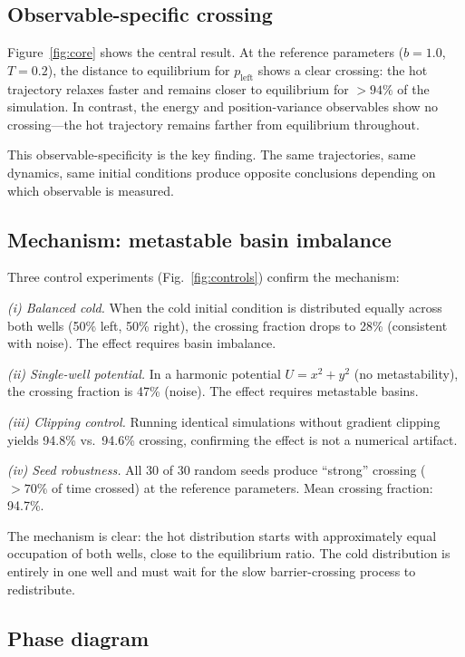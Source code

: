 \documentclass[aps,pre,reprint,superscriptaddress,showpacs]{revtex4-2}
\begin{document}
\subsection{Observable-specific crossing}

Figure~\ref{fig:core} shows the central result. At the reference parameters
($b = 1.0$, $T = 0.2$), the distance to equilibrium for $p_\mathrm{left}$
shows a clear crossing: the hot trajectory relaxes faster and remains closer to
equilibrium for $>94\%$ of the simulation. In contrast, the energy and
position-variance observables show no crossing---the hot trajectory remains
farther from equilibrium throughout.

This observable-specificity is the key finding. The same trajectories, same
dynamics, same initial conditions produce opposite conclusions depending on
which observable is measured.

\subsection{Mechanism: metastable basin imbalance}

Three control experiments (Fig.~\ref{fig:controls}) confirm the mechanism:

\textit{(i) Balanced cold.} When the cold initial condition is distributed
equally across both wells (50\% left, 50\% right), the crossing fraction drops
to 28\% (consistent with noise). The effect requires basin imbalance.

\textit{(ii) Single-well potential.} In a harmonic potential
$U = x^2 + y^2$ (no metastability), the crossing fraction is 47\% (noise).
The effect requires metastable basins.

\textit{(iii) Clipping control.} Running identical simulations without gradient
clipping yields 94.8\% vs.\ 94.6\% crossing, confirming the effect is not a
numerical artifact.

\textit{(iv) Seed robustness.} All 30 of 30 random seeds produce ``strong''
crossing ($>70\%$ of time crossed) at the reference parameters. Mean crossing
fraction: 94.7\%.

The mechanism is clear: the hot distribution starts with approximately equal
occupation of both wells, close to the equilibrium ratio. The cold distribution
is entirely in one well and must wait for the slow barrier-crossing process to
redistribute.

\subsection{Phase diagram}
\end{document}
